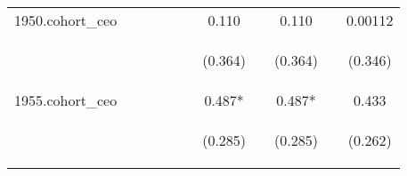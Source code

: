 \begin{center}
\begin{tabular}{lcccccccccc}
1950.cohort\_ceo &  &  &  &  &  & 0.110 &  & 0.110 &  & 0.00112 \\
\vspace{4pt} & \begin{footnotesize}\end{footnotesize} & \begin{footnotesize}\end{footnotesize} & \begin{footnotesize}\end{footnotesize} & \begin{footnotesize}\end{footnotesize} & \begin{footnotesize}\end{footnotesize} & \begin{footnotesize}(0.364)\end{footnotesize} & \begin{footnotesize}\end{footnotesize} & \begin{footnotesize}(0.364)\end{footnotesize} & \begin{footnotesize}\end{footnotesize} & \begin{footnotesize}(0.346)\end{footnotesize} \\
1955.cohort\_ceo &  &  &  &  &  & 0.487* &  & 0.487* &  & 0.433 \\
\vspace{4pt} & \begin{footnotesize}\end{footnotesize} & \begin{footnotesize}\end{footnotesize} & \begin{footnotesize}\end{footnotesize} & \begin{footnotesize}\end{footnotesize} & \begin{footnotesize}\end{footnotesize} & \begin{footnotesize}(0.285)\end{footnotesize} & \begin{footnotesize}\end{footnotesize} & \begin{footnotesize}(0.285)\end{footnotesize} & \begin{footnotesize}\end{footnotesize} & \begin{footnotesize}(0.262)\end{footnotesize} \\

\end{tabular}
\end{center}

